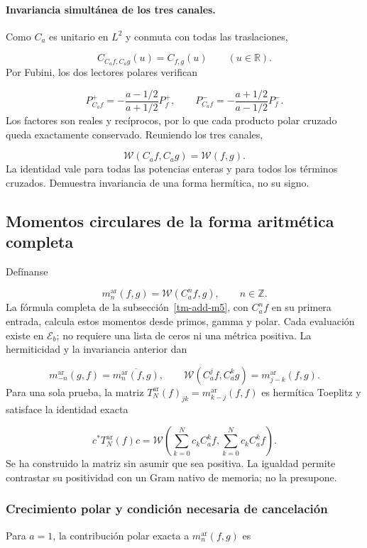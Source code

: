 \paragraph{Invariancia simultánea de los tres canales.}
\label{tm-add:invariancia-weil} Como \(C_a\) es unitario en \(L^2\) y conmuta con todas las traslaciones,

\[
C_{C_af,C_ag}(u)=C_{f,g}(u)\qquad(u\in\mathbb R).
\]
Por Fubini, los dos lectores polares verifican

\[
P_{C_af}^+=-\frac{a-1/2}{a+1/2}P_f^+,
\qquad
P_{C_af}^-=-\frac{a+1/2}{a-1/2}P_f^-.
\]
Los factores son reales y recíprocos, por lo que cada producto polar cruzado queda exactamente conservado. Reuniendo los tres canales,

\[
\boxed{\mathscr W(C_af,C_ag)=\mathscr W(f,g).}
\]
La identidad vale para todas las potencias enteras y para todos los términos cruzados. Demuestra invariancia de una forma hermítica, no su signo.


\subsection{Momentos circulares de la forma aritmética completa}
\label{tm-add-m6}
Defínanse

\[
m_n^{\mathrm{ar}}(f,g)=\mathscr W(C_a^n f,g),\qquad n\in\mathbb Z.
\]
La fórmula completa de la subsección~\ref{tm-add-m5}, con \(C_a^nf\) en su primera entrada, calcula estos momentos desde primos, gamma y polar. Cada evaluación existe en \(\mathscr E_b\); no requiere una lista de ceros ni una métrica positiva. La hermiticidad y la invariancia anterior dan

\[
m_{-n}^{\mathrm{ar}}(g,f)=\overline{m_n^{\mathrm{ar}}(f,g)},\qquad
\mathscr W(C_a^j f,C_a^k g)=m_{j-k}^{\mathrm{ar}}(f,g).
\]
Para una sola prueba, la matriz \(T_N^{\mathrm{ar}}(f)_{jk}=m_{k-j}^{\mathrm{ar}}(f,f)\) es hermítica Toeplitz y satisface la identidad exacta

\[
c^*T_N^{\mathrm{ar}}(f)c
=\mathscr W\!\left(\sum_{k=0}^N c_k C_a^k f,
                    \sum_{k=0}^N c_k C_a^k f\right).
\]
Se ha construido la matriz sin asumir que sea positiva. La igualdad permite contrastar su positividad con un Gram nativo de memoria; no la presupone.


\subsubsection{Crecimiento polar y condición necesaria de cancelación}
\label{tm-add-m6-1}
Para \(a=1\), la contribución polar exacta a \(m_n^{\mathrm{ar}}(f,g)\) es

